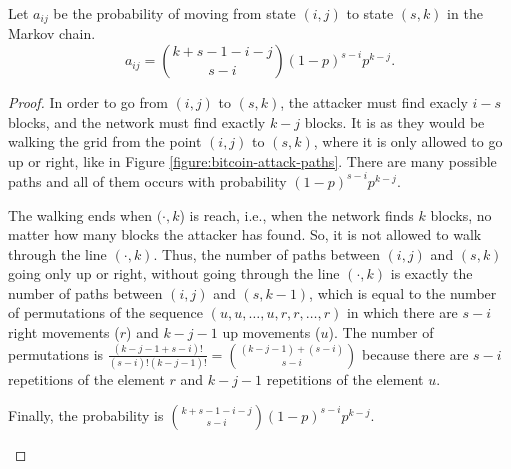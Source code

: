 \begin{theorem}
	Let $a_{ij}$ be the probability of moving from state $(i, j)$ to state $(s, k)$ in the Markov chain.
	$$a_{ij} = \binom{k+s-1-i-j}{s-i} (1-p)^{s-i} p^{k-j}.$$
\end{theorem}
\begin{proof}

In order to go from $(i, j)$ to $(s, k)$, the attacker must find exacly $i-s$ blocks, and the network must find exactly $k-j$ blocks. It is as they would be walking the grid from the point $(i, j)$ to $(s, k)$, where it is only allowed to go up or right, like in Figure \ref{figure:bitcoin-attack-paths}. There are many possible paths and all of them occurs with probability $(1-p)^{s-i} p^{k-j}$.

The walking ends when $(\cdot, k$) is reach, i.e., when the network finds $k$ blocks, no matter how many blocks the attacker has found. So, it is not allowed to walk through the line $(\cdot, k)$. Thus, the number of paths between $(i, j)$ and $(s, k)$ going only up or right, without going through the line $(\cdot, k)$ is exactly the number of paths between $(i, j)$ and $(s, k-1)$, which is equal to the number of permutations of the sequence $(u, u, \dots, u, r, r, \dots, r)$ in which there are $s-i$ right movements ($r$) and $k-j-1$ up movements ($u$). The number of permutations is $\frac{(k-j-1+s-i)!}{(s-i)!(k-j-1)!} = \binom{(k-j-1)+(s-i)}{s-i}$ because there are $s-i$ repetitions of the element $r$ and $k-j-1$ repetitions of the element $u$.

Finally, the probability is $\binom{k+s-1-i-j}{s-i} (1-p)^{s-i} p^{k-j}$.

\begin{figure}[ht]
  \centering
\end{figure}
\end{proof}
